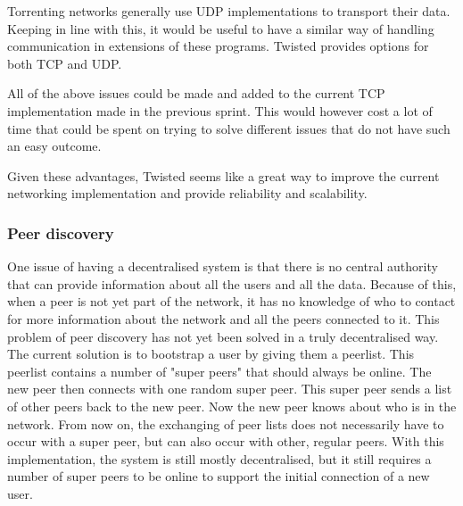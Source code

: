 Torrenting networks generally use UDP implementations to transport their data.
Keeping in line with this, it would be useful to have a similar way of handling communication in extensions of these programs.
Twisted provides options for both TCP and UDP.


All of the above issues could be made and added to the current TCP implementation made in the previous sprint.
This would however cost a lot of time that could be spent on trying to solve different issues that do not have such an easy outcome.

Given these advantages, Twisted seems like a great way to improve the current networking implementation and provide reliability and scalability.

\subsubsection{Peer discovery}
\label{sprint2:peerdiscovery}
One issue of having a decentralised system is that there is no central authority that can provide information about all the users and all the data. 
Because of this, when a peer is not yet part of the network, it has no knowledge of who to contact for more information about the network and all the peers connected to it. 
This problem of peer discovery has not yet been solved in a truly decentralised way. 
The current solution is to bootstrap a user by giving them a peerlist.
This peerlist contains a number of "super peers" that should always be online. 
The new peer then connects with one random super peer. 
This super peer sends a list of other peers back to the new peer.
Now the new peer knows about who is in the network.
From now on, the exchanging of peer lists does not necessarily have to occur with a super peer, but can also occur with other, regular peers.
With this implementation, the system is still mostly decentralised, but it still requires a number of super peers to be online to support the initial connection of a new user.

